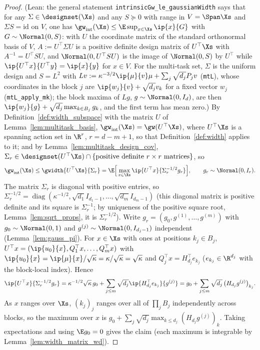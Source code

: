 \begin{proof}
\leanok
{}
(Lean: the general statement \texttt{intrinsicGw\_le\_gaussianWidth} says that for any
$\Sigma \in \designset(\Xs)$ and any $S \succeq 0$ with range in $V = \Span\Xs$ and
$\Sigma S = \mathrm{id}$ on $V$, one has $\gw_{\mathrm{int}}(\Xs) \le \E\sup_{x\in\Xs}\ip{x}{G}$
with $G \sim \Normal(0,S)$: with $U$ the coordinate matrix of the standard orthonormal basis
of $V$, $A := U^\top\Sigma U$ is a positive definite design matrix of $U^\top\Xs$ with
$A^{-1} = U^\top SU$, and $\Normal(0,U^\top SU)$ is the image of $\Normal(0,S)$ by $U^\top$
while $\ip{U^\top x}{U^\top y} = \ip{x}{y}$ for $x \in V$. For the multi-task set, $\Sigma$ is
the uniform design and $S = L^2$ with $L v := \kappa^{-3/2}\ip{\mu}{v}\mu + \sum_j\sqrt{d_j}P_jv$
(\texttt{mtL}), whose coordinates in the block $j$ are $\ip{w_j}{v} + \sqrt{d_j}v_k$ for a fixed
vector $w_j$ (\texttt{mtL\_apply\_mk}); the block maxima of $Lg$, $g\sim\Normal(0,I_d)$, are
then $\ip{w_j}{g} + \sqrt{d_j}\max_{k\in B_j}g_k$, and the first term has mean zero.)
By Definition~\ref{def:width_subspace} with the matrix $U$ of Lemma~\ref{lem:multitask_basis},
$\gw_{\mathrm{int}}(\Xs) = \gw(U^\top\Xs)$, where $U^\top\Xs$ is a spanning action set in
$\R^r$, $r = d - m + 1$, so that Definition~\ref{def:width} applies to it; and by
Lemma~\ref{lem:multitask_design_cov},
$\Sigma_r \in \designset(U^\top\Xs)\cap\{\text{positive definite } r\times r \text{ matrices}\}$, so
\[
  \gw_{\mathrm{int}}(\Xs) \le \gwidth{U^\top\Xs}{\Sigma_r} = \E\Big[\max_{x\in\Xs}\ip{U^\top x}{\Sigma_r^{-1/2}g_r}\Big],
  \qquad g_r \sim \Normal(0, I_r).
\]
The matrix $\Sigma_r$ is diagonal with positive entries, so
$\Sigma_r^{-1/2} = \operatorname{diag}(\kappa^{-1/2}, \sqrt{d_1}I_{d_1-1},\dots,\sqrt{d_m}I_{d_m-1})$
(this diagonal matrix is positive definite and its square is $\Sigma_r^{-1}$; by uniqueness
of the positive square root, Lemma~\ref{lem:sqrt_props}, it is $\Sigma_r^{-1/2}$). Write
$g_r = (g_0, g^{(1)},\dots,g^{(m)})$ with $g_0 \sim \Normal(0,1)$ and
$g^{(j)}\sim\Normal(0,I_{d_j-1})$ independent (Lemma~\ref{lem:gauss_pi}). For $x \in \Xs$
with ones at positions $k_j \in B_j$, $U^\top x = (\ip{u_0}{x}, Q_1^\top x,\dots,Q_m^\top x)$
with $\ip{u_0}{x} = \ip{\mu}{x}/\sqrt\kappa = \kappa/\sqrt\kappa = \sqrt\kappa$ and
$Q_j^\top x = H_{d_j}^\top e_{k_j}$ ($e_{k_j} \in \R^{d_j}$ with the block-local index).
Hence
\[
  \ip{U^\top x}{\Sigma_r^{-1/2}g_r} = \kappa^{-1/2}\sqrt\kappa\, g_0
  + \sum_{j\le m}\sqrt{d_j}\ip{H_{d_j}^\top e_{k_j}}{g^{(j)}}
  = g_0 + \sum_{j\le m}\sqrt{d_j}\,\big(H_{d_j}g^{(j)}\big)_{k_j}.
\]
As $x$ ranges over $\Xs$, $(k_j)_j$ ranges over all of $\prod_j B_j$ independently across
blocks, so the maximum over $x$ is
$g_0 + \sum_j\sqrt{d_j}\max_{k\le d_j}(H_{d_j}g^{(j)})_k$. Taking expectations and using
$\E g_0 = 0$ gives the claim (each maximum is integrable by Lemma~\ref{lem:width_matrix_wd}).
\end{proof}

